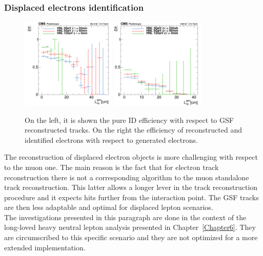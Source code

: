 \subsubsection{Displaced electrons
  identification}\label{sec:c2dispele}
\begin{figure}[h]
\centering
  \includegraphics[width=0.4\textwidth]{Figures/c2/_e_l2id_Lxy_eff.png}
  \includegraphics[width=0.4\textwidth]{Figures/c2/el_l2full_Lxy_eff.png}
  \caption{On the left, it is shown the pure ID efficiency with
    respect to GSF reconstructed tracks. On the right the efficiency
    of reconstructed and identified electrons with
    respect to generated electrons. \basile}
  \label{fig:basileele}
\end{figure}

The reconstruction of displaced electron objects is more challenging
with respect to the muon one. 
The main reason is the fact that for electron track reconstruction
there is not a corresponding algorithm to the muon standalone track
reconstruction. This latter allows a longer lever in the track
reconstruction procedure and it expects hits
further from the interaction point. The GSF tracks are then less
adaptable and optimal for displaced lepton scenarios.\\

The investigations presented in this paragraph are done in the context
of the long-loved heavy neutral lepton analysis presented in
Chapter~\ref{Chapter6}. They are circumscribed
to this specific scenario and they are not optimized for a more extended
implementation.  

